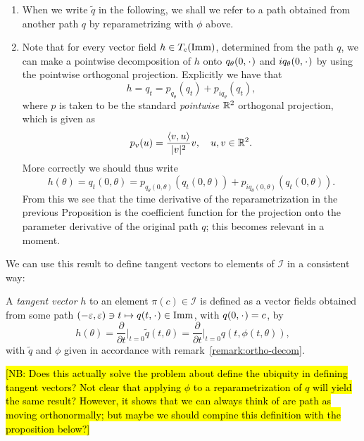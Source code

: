 \begin{remark}
  \label{remark:ortho-decom}
  \begin{enumerate}
  \item  When we write $\tilde{q}$ in the following, we shall we refer to a path obtained from another path $q$ by reparametrizing with $\phi$ above.
  \item Note that for every vector field $h \in T_c(\mathop{}\!\mathrm{Imm})$, determined from the path $q$, we can make a pointwise decomposition of $h$ onto $q_{\theta}(0, \blank)$ and $iq_{\theta}(0, \blank)$ by using the pointwise orthogonal projection. Explicitly we have that
  \begin{equation*}
    h = q_t = p_{q_{\theta}}(q_{t}) + p_{iq_{\theta}}(q_{t}),
  \end{equation*}
  where $p$ is taken to be the standard \textit{pointwise} $\mathbb{R}^2$ orthogonal projection, which is given as
  \begin{equation*}
    p_v(u) = \frac{\langle v, u \rangle}{|v|^2} v, \quad u, v \in \mathbb{R}^2.
  \end{equation*}
  More correctly we should thus write
  \begin{equation*}
    h(\theta) = q_t(0,\theta) = p_{q_{\theta}(0,\theta)}(q_{t}(0,\theta)) +
    p_{iq_{\theta}(0,\theta)}(q_{t}(0,\theta)).
  \end{equation*}
  From this we see that the time derivative of the reparametrization in the previous Proposition is the coefficient function for the projection onto the parameter derivative of the original path $q$; this becomes relevant in a moment.
\end{enumerate}
\end{remark}

We can use this result to define tangent vectors to elements of $\mathcal{I}$ in
a consistent way:

\begin{definition}
  \label{def:tang-quotient}
  A \textit{tangent vector} $h$ to an element $\pi(c) \in \mathcal{I}$ is defined as a vector fields obtained from some path $(-\epsilon, \epsilon) \ni t \mapsto q(t, \blank) \in \I$, with $q(0,\blank) = c$, by
  \begin{equation}
    \label{eq:tang-quotient}
    h(\theta) = \frac{\partial }{\partial t} \bigg\vert_{t=0} \tilde{q}(t,\theta)
    = \frac{\partial }{\partial t} \bigg\vert_{t=0} q(t, \phi(t,\theta)),
  \end{equation}
  with $\tilde{q}$ and $\phi$ given in accordance with remark~\ref{remark:ortho-decom}.

  \hl{[NB: Does this actually solve the problem about define the ubiquity in defining tangent vectors? Not clear that applying $\phi$ to a reparametrization of $q$ will yield the same result? However, it shows that we can always think of are path as moving orthonormally; but maybe we should compine this definition with the proposition below?]}
\end{definition}


